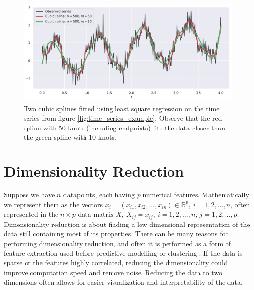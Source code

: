\documentclass[a4paper]{memoir}
\theoremstyle{plain}
\theoremstyle{definition}
\theoremstyle{remark}
\begin{document}
\begin{figure}[tb]
        \centering
        \includegraphics[width=\linewidth]{./code/figures/cubic_splines.pdf}
        \caption{Two cubic splines fitted using least square regression on the time series from figure \ref{fig:time_series_example}.
        Observe that the red spline with 50 knots (including endpoints) fits the data closer than the green spline with 10 knots.}
        \label{fig:cubic_splines}
\end{figure}




\section{Dimensionality Reduction}
Suppose we have $n$ datapoints, each having $p$ numerical features. 
Mathematically we represent them as the vectors $x_i = (x_{i1}, x_{i2}, \hdots, x_{in} ) \in \mathbb{R}^p, \ i = 1, 2, \hdots, n$, often represented in the $n \times p$ data matrix $X, \ X_{ij} = x_{ij}, \ i = 1, 2, \hdots, n, \ j = 1, 2, \hdots, p$.
Dimensionality reduction is about finding a low dimensional representation of the data still containing most of its properties.
There can be many reasons for performing dimensionality reduction, and often it is performed as a form of feature extraction used before predictive modelling or clustering \cite{hastie}.
If the data is sparse or the features highly correlated, reducing the dimensionality could improve computation speed and remove noise.
Reducing the data to two dimensions often allows for easier visualization and interpretability of the data.
\end{document}
